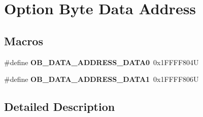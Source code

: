 \hypertarget{group___f_l_a_s_h_ex___o_b___data___address}{}\section{Option Byte Data Address}
\label{group___f_l_a_s_h_ex___o_b___data___address}
\subsection*{Macros}
\begin{DoxyCompactItemize}
\item 
\mbox{\label{group___f_l_a_s_h_ex___o_b___data___address_gab29881e9575bfff3504b84afa20cafbe}} 
\#define {\bfseries O\+B\+\_\+\+D\+A\+T\+A\+\_\+\+A\+D\+D\+R\+E\+S\+S\+\_\+\+D\+A\+T\+A0}~0x1\+F\+F\+F\+F804U
\item 
\mbox{\label{group___f_l_a_s_h_ex___o_b___data___address_ga33cb1b378fd742c722f5bdce21c65b0e}} 
\#define {\bfseries O\+B\+\_\+\+D\+A\+T\+A\+\_\+\+A\+D\+D\+R\+E\+S\+S\+\_\+\+D\+A\+T\+A1}~0x1\+F\+F\+F\+F806U
\end{DoxyCompactItemize}


\subsection{Detailed Description}
